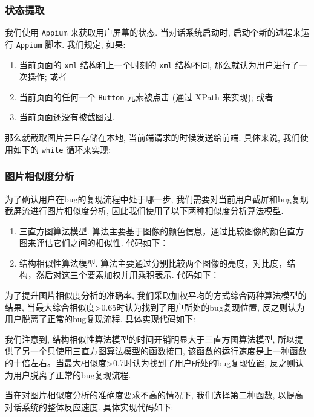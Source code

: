 \subsubsection{状态提取}
我们使用 \lstinline{Appium} 来获取用户屏幕的状态. 当对话系统启动时, 启动个新的进程来运行 \lstinline{Appium} 脚本. 我们规定, 如果:
\begin{enumerate}
    \item 当前页面的 \lstinline{xml} 结构和上一个时刻的 \lstinline{xml} 结构不同, 那么就认为用户进行了一次操作; 或者
    \item 当前页面的任何一个 \lstinline{Button} 元素被点击 (通过 XPath 来实现); 或者
    \item 当前页面还没有被截图过.
\end{enumerate}
那么就截取图片并且存储在本地, 当前端请求的时候发送给前端. 具体来说, 我们使用如下的 \lstinline{while} 循环来实现:

\scalebox{0.9}{
    
}
\subsubsection{图片相似度分析}

为了确认用户在bug的复现流程中处于哪一步, 我们需要对当前用户截屏和bug复现截屏流进行图片相似度分析, 因此我们使用了以下两种相似度分析算法模型.
\begin{enumerate}
    \item 三直方图算法模型. 算法主要基于图像的颜色信息，通过比较图像的颜色直方图来评估它们之间的相似性. 代码如下：
    
    \scalebox{0.9}{
        
    }
    \item 结构相似性算法模型. 算法主要通过分别比较两个图像的亮度，对比度，结构，然后对这三个要素加权并用乘积表示. 代码如下：

    \scalebox{0.9}{
        
    }
\end{enumerate}

为了提升图片相似度分析的准确率, 我们采取加权平均的方式综合两种算法模型的结果, 当最大综合相似度>0.65时认为找到了用户所处的bug复现位置, 反之则认为用户脱离了正常的bug复现流程. 具体实现代码如下:

\scalebox{0.9}{
    
}

我们注意到, 结构相似性算法模型的时间开销明显大于三直方图算法模型, 所以提供了另一个只使用三直方图算法模型的函数接口, 该函数的运行速度是上一种函数的十倍左右。当最大相似度>0.7时认为找到了用户所处的bug复现位置, 反之则认为用户脱离了正常的bug复现流程.

当在对图片相似度分析的准确度要求不高的情况下, 我们选择第二种函数, 以提高对话系统的整体反应速度. 具体实现代码如下:

\scalebox{0.9}{
    
}